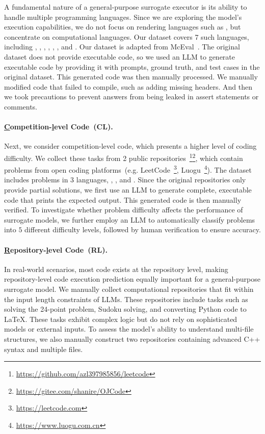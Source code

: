 A fundamental nature of a general-purpose surrogate executor is its ability to handle multiple programming languages. Since we are exploring the model's execution capabilities, we do not focus on rendering languages such as , but concentrate on computational languages. Our dataset covers 7 such languages, including , , , , , , and . Our dataset is adapted from McEval~\citep{chai2024mcevalmassivelymultilingualcode}. The original dataset does not provide executable code, so we used an LLM to generate executable code by providing it with prompts, ground truth, and test cases in the original dataset. This generated code was then manually processed. We manually modified code that failed to compile, such as adding missing headers. And then we took precautions to prevent answers from being leaked in assert statements or comments.

\paragraph{\underline{C}ompetition-\underline{l}evel Code~(CL).}

Next, we consider competition-level code, which presents a higher level of coding difficulty. We collect these tasks from 2 public repositories~\footnote{\url{https://github.com/azl397985856/leetcode}}\footnote{\url{https://gitee.com/shanire/OJCode}}, which contain problems from open coding platforms~(e.g. LeetCode~\footnote{\url{https://leetcode.com}}, Luogu~\footnote{\url{https://www.luogu.com.cn}}). The dataset includes problems in 3 languages, , , and .
%
Since the original repositories only provide partial solutions, we first use an LLM to generate complete, executable code that prints the expected output. This generated code is then manually verified. To investigate whether problem difficulty affects the performance of surrogate models, we further employ an LLM to automatically classify problems into $5$ different difficulty levels, followed by human verification to ensure accuracy.

\paragraph{\underline{R}epository-\underline{l}evel Code~(RL).}

In real-world scenarios, most code exists at the repository level, making repository-level code execution prediction equally important for a general-purpose surrogate model. We manually collect computational repositories that fit within the input length constraints of LLMs. These repositories include tasks such as solving the 24-point problem, Sudoku solving, and converting Python code to LaTeX. These tasks exhibit complex logic but do not rely on sophisticated models or external inputs. To assess the model's ability to understand multi-file structures, we also manually construct two repositories containing advanced C++ syntax and multiple files.

